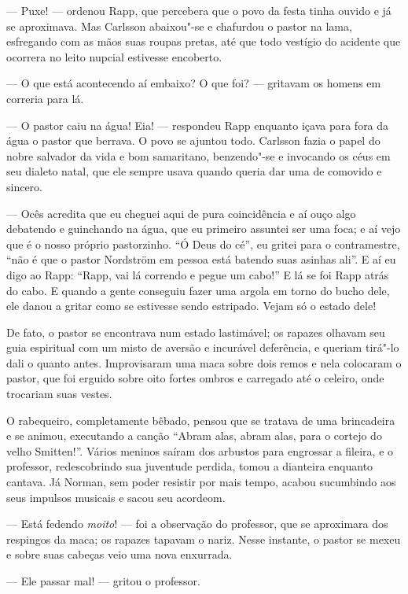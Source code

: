 --- Puxe! --- ordenou Rapp, que percebera que o povo da festa tinha ouvido e já
se aproximava. Mas Carlsson abaixou"-se e chafurdou o pastor na lama,
esfregando com as mãos suas roupas pretas, até que todo vestígio do
acidente que ocorrera no leito nupcial estivesse encoberto.

--- O que está acontecendo aí embaixo? O que foi? --- gritavam os homens em correria para lá.

--- O pastor caiu na água! Eia! --- respondeu Rapp enquanto içava para fora
da água o pastor que berrava. O povo se ajuntou todo. Carlsson fazia o papel do
nobre salvador da vida e bom samaritano, benzendo"-se e invocando os céus em seu
dialeto natal, que ele sempre usava quando queria dar uma de comovido e sincero.

--- Ocês acredita que eu cheguei aqui de pura coincidência e aí ouço algo 
debatendo e guinchando na água, que eu primeiro assuntei ser uma foca; e aí vejo que
é o nosso próprio pastorzinho. ``Ó Deus do cé'', eu gritei para o contramestre,
``não é que o pastor Nordström em pessoa está batendo suas asinhas ali''. E aí eu
digo ao Rapp: ``Rapp, vai lá correndo e pegue um cabo!'' E lá se foi Rapp atrás
do cabo. E quando a gente conseguiu fazer uma argola em torno do bucho dele, ele
danou a gritar como se estivesse sendo estripado. Vejam só o estado dele!

De fato, o pastor se encontrava num estado lastimável; os rapazes olhavam seu
guia espiritual com um misto de aversão e incurável deferência, e queriam tirá"-lo
dali o quanto antes. Improvisaram uma maca sobre dois remos e nela
colocaram o pastor, que foi erguido sobre oito fortes ombros e carregado até o
celeiro, onde trocariam suas vestes.

O rabequeiro, completamente bêbado, pensou que se tratava de uma
brincadeira e se animou, executando a canção ``Abram alas, abram alas, para o
cortejo do velho Smitten!''. Vários meninos saíram dos arbustos para engrossar a fileira, 
e o professor, redescobrindo sua juventude perdida, tomou a dianteira 
enquanto cantava. Já Norman, sem poder resistir por mais tempo, acabou sucumbindo
aos seus impulsos musicais e sacou seu acordeom.

--- Está fedendo \textit{moito}! --- foi a observação do professor, que se aproximara dos
respingos da maca; os rapazes tapavam o nariz. Nesse instante, o pastor se
mexeu e sobre suas cabeças veio uma nova enxurrada.

--- Ele passar mal! --- gritou o professor.

